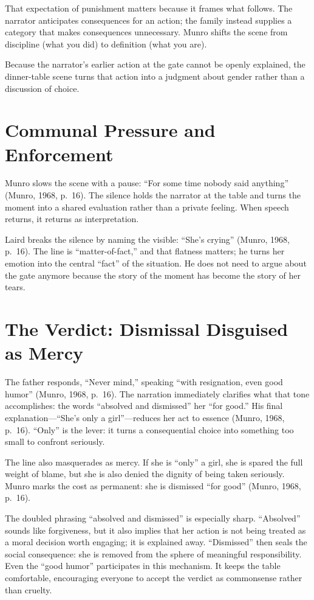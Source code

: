 \documentclass[12pt]{article}
\begin{document}
That expectation of punishment matters because it frames what follows. The narrator anticipates consequences for an action; the family instead supplies a category that makes consequences unnecessary. Munro shifts the scene from discipline (what you did) to definition (what you are).

Because the narrator's earlier action at the gate cannot be openly explained, the dinner-table scene turns that action into a judgment about gender rather than a discussion of choice.

\section{Communal Pressure and Enforcement}
Munro slows the scene with a pause: ``For some time nobody said anything'' (Munro, 1968, p.~16). The silence holds the narrator at the table and turns the moment into a shared evaluation rather than a private feeling. When speech returns, it returns as interpretation.

Laird breaks the silence by naming the visible: ``She's crying'' (Munro, 1968, p.~16). The line is ``matter-of-fact,'' and that flatness matters; he turns her emotion into the central ``fact'' of the situation. He does not need to argue about the gate anymore because the story of the moment has become the story of her tears.

\section{The Verdict: Dismissal Disguised as Mercy}
The father responds, ``Never mind,'' speaking ``with resignation, even good humor'' (Munro, 1968, p.~16). The narration immediately clarifies what that tone accomplishes: the words ``absolved and dismissed'' her ``for good.'' His final explanation---``She's only a girl''---reduces her act to essence (Munro, 1968, p.~16). ``Only'' is the lever: it turns a consequential choice into something too small to confront seriously.

The line also masquerades as mercy. If she is ``only'' a girl, she is spared the full weight of blame, but she is also denied the dignity of being taken seriously. Munro marks the cost as permanent: she is dismissed ``for good'' (Munro, 1968, p.~16).

The doubled phrasing ``absolved and dismissed'' is especially sharp. ``Absolved'' sounds like forgiveness, but it also implies that her action is not being treated as a moral decision worth engaging; it is explained away. ``Dismissed'' then seals the social consequence: she is removed from the sphere of meaningful responsibility. Even the ``good humor'' participates in this mechanism. It keeps the table comfortable, encouraging everyone to accept the verdict as commonsense rather than cruelty.
\end{document}
